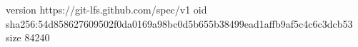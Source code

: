 version https://git-lfs.github.com/spec/v1
oid sha256:54d858627609502f0da0169a98bc0d5b655b38499ead1affb9af5c4c6c3dcb53
size 84240
